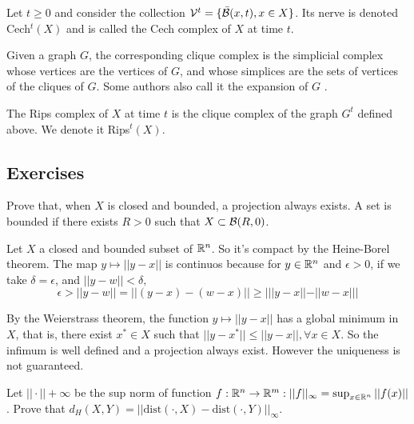 \begin{definition}
    Let $t \ge 0$ and consider the collection $\mathcal{V}^t = \{
    \bar{\mathcal{B}}(x,t), x \in X\}$. Its nerve is denoted Cech$^t(X)$ and is called the Cech complex of $X$ at time $t$.
\end{definition}

\begin{definition}
    Given a graph $G$, the corresponding clique complex is the simplicial
    complex whose vertices are the vertices of $G$, and whose simplices are
    the sets of vertices of the cliques of $G$. Some authors also call it the
    expansion of $G$
    .
\end{definition}

\begin{definition}
    The Rips complex of $X$ at time $t$ is the clique complex of the graph
    $G^t$ defined above. We denote it Rips$^t(X).$
\end{definition}

\subsection{Exercises}

\begin{exercise}
    Prove that, when $X$ is closed and bounded, a projection always exists. A set is bounded if there exists $R > 0$ such that $X \subset \mathcal{B}(R, 0)$.
\end{exercise}

Let $X$ a closed and bounded subset of $\mathbb{R}^n$. So it's compact by the
Heine-Borel theorem. The map $y \mapsto ||y - x||$ is continuos because for $y
\in \mathbb{R}^n$ and $\epsilon > 0$, if we take $\delta = \epsilon$, and $||y - w|| <
\delta, $
$$
\epsilon > ||y - w|| = ||(y - x) - (w - x)|| \ge |||y-x|| - ||w-x|||
$$

By the Weierstrass theorem, the function $y \mapsto ||y-x||$ has a global
minimum in $X$, that is, there exist $x^* \in X$ such that $||y - x^*|| \le
||y - x||, \forall x \in X$. So the infimum is well defined and a projection
always exist. However the uniqueness is not guaranteed. 

\noindent\linia

\begin{exercise}
    Let $||\cdot||+{\infty}$ be the sup norm of function $f : \mathbb{R}^n \to \mathbb{R}^m:
    ||f||_{\infty} = \sup_{x \in \mathbb{R}^n} ||f(x)||$. Prove that $d_H(X, Y) = ||\text{dist}(\cdot, X) - \text{dist}(\cdot, Y)||_{\infty}$.
\end{exercise}

